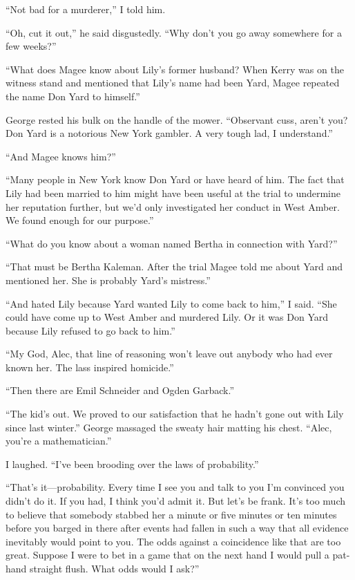 \documentclass{novel}
\begin{document}
{“Not bad for a murderer,” I told him.

“Oh, cut it out,” he said disgustedly. “Why don’t you go away somewhere for a few weeks?”

“What does Magee know about Lily’s former husband? When Kerry was on the witness stand and mentioned that Lily’s name had been Yard, Magee repeated the name Don Yard to himself.”

George rested his bulk on the handle of the mower. “Observant cuss, aren’t you? Don Yard is a notorious New York gambler. A very tough lad, I understand.”

“And Magee knows him?”

“Many people in New York know Don Yard or have heard of him. The fact that Lily had been married to him might have been useful at the trial to undermine her reputation further, but we’d only investigated her conduct in West Amber. We found enough for our purpose.”

“What do you know about a woman named Bertha in connection with Yard?”

“That must be Bertha Kaleman. After the trial Magee told me about Yard and mentioned her. She is probably Yard’s mistress.”

“And hated Lily because Yard wanted Lily to come back to him,” I said. “She could have come up to West Amber and murdered Lily. Or it was Don Yard because Lily refused to go back to him.”

“My God, Alec, that line of reasoning won’t leave out anybody who had ever known her. The lass inspired homicide.”

“Then there are Emil Schneider and Ogden Garback.”

“The kid’s out. We proved to our satisfaction that he hadn’t gone out with Lily since last winter.” George massaged the sweaty hair matting his chest. “Alec, you’re a mathematician.”

I laughed. “I’ve been brooding over the laws of probability.”

“That’s it—probability. Every time I see you and talk to you I’m convinced you didn’t do it. If you had, I think you’d admit it. But let’s be frank. It’s too much to believe that somebody stabbed her a minute or five minutes or ten minutes before you barged in there after events had fallen in such a way that all evidence inevitably would point to you. The odds against a coincidence like that are too great. Suppose I were to bet in a game that on the next hand I would pull a pat-hand straight flush. What odds would I ask?”

}
\end{document}
